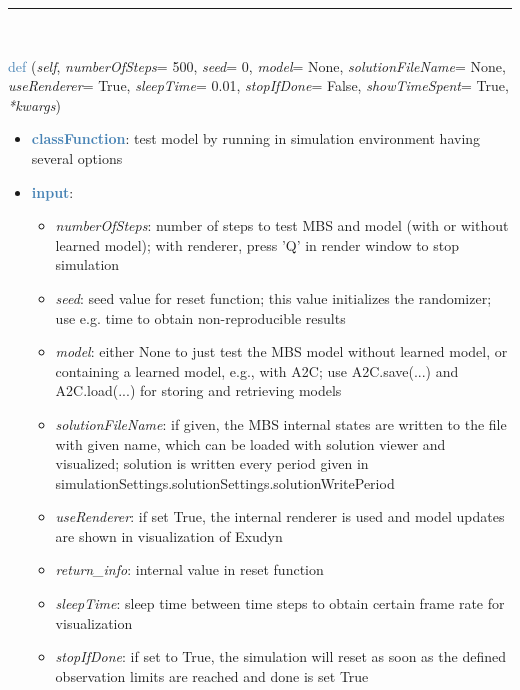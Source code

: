 \begin{itemize}[leftmargin=1.4cm]
\begin{itemize}[leftmargin=1.4cm]
%
\noindent\rule{8cm}{0.75pt}\vspace{1pt} \\ 
\begin{flushleft}
\noindent \textcolor{steelblue}{def {\bf {}}}\label{sec:artificialIntelligence:OpenAIGymInterfaceEnv(Env):TestModel}
({\it self}, {\it numberOfSteps}= 500, {\it seed}= 0, {\it model}= None, {\it solutionFileName}= None, {\it useRenderer}= True, {\it sleepTime}= 0.01, {\it stopIfDone}= False, {\it showTimeSpent}= True, {\it **kwargs})
\end{flushleft}
\setlength{\itemindent}{0.7cm}
\begin{itemize}[leftmargin=0.7cm]
\item[--]\textcolor{steelblue}{\bf classFunction}: test model by running in simulation environment having several options
\item[--]\textcolor{steelblue}{\bf input}: \vspace{-6pt}
\begin{itemize}[leftmargin=1.2cm]
\setlength{\itemindent}{-0.7cm}
\item[]{\it numberOfSteps}: number of steps to test MBS and model (with or without learned model); with renderer, press 'Q' in render window to stop simulation
\item[]{\it seed}: seed value for reset function; this value initializes the randomizer; use e.g. time to obtain non-reproducible results
\item[]{\it model}: either None to just test the MBS model without learned model, or containing a learned model, e.g., with A2C; use A2C.save(...) and A2C.load(...) for storing and retrieving models
\item[]{\it solutionFileName}: if given, the MBS internal states are written to the file with given name, which can be loaded with solution viewer and visualized; solution is written every period given in simulationSettings.solutionSettings.solutionWritePeriod
\item[]{\it useRenderer}: if set True, the internal renderer is used and model updates are shown in visualization of Exudyn
\item[]{\it return\_info}: internal value in reset function
\item[]{\it sleepTime}: sleep time between time steps to obtain certain frame rate for visualization
\item[]{\it stopIfDone}: if set to True, the simulation will reset as soon as the defined observation limits are reached and done is set True

\end{itemize}
\end{itemize}
\end{itemize}
\end{itemize}

